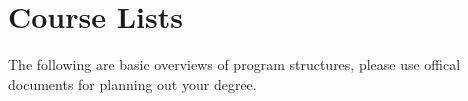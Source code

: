 \section{Course Lists}
\hypertarget{core:lists}{}

The following are basic overviews of program structures, please use offical documents for planning out your degree.


\newpage

\newpage
